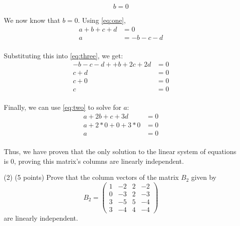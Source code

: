 \documentclass[12pt]{article}
\begin{document}
\begin{itemize}
\[b = 0\]

We now know that $b=0$. Using \eqref{eq:one},
\begin{align*}
    a + b + c + d &= 0 \\
    a &= -b - c - d \\
\end{align*}

Substituting this into \eqref{eq:three}, we get:
\begin{align*}
    -b - c - d + + b + 2c + 2d &= 0 \\
    c + d &= 0 \\
    c + 0 &= 0 \\
    c &= 0 \\
\end{align*}

Finally, we can use \eqref{eq:two} to solve for $a$:
\begin{align*}
    a + 2b + c + 3d &= 0 \\
    a + 2 * 0 + 0 + 3 * 0 &= 0 \\
    a &= 0 \\
\end{align*}

Thus, we have proven that the only solution to the linear system of equations is 0, proving this matrix's columns are linearly independent.





\item[(2)](5 points)
Prove that the column vectors of the matrix $B_2$ given by 
\[
B_2 = 
\begin{pmatrix}
1 & -2 & 2 & -2\\
0 & -3 & 2 & -3 \\
3 & -5 & 5 & -4 \\
3 & -4 & 4 & -4
\end{pmatrix}
\]
are linearly  independent.




\end{itemize}
\end{document}
